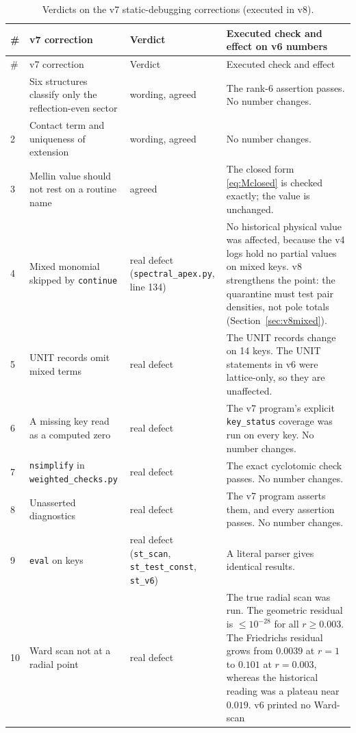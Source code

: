 \documentclass[11pt,a4paper]{article}
\newcommand{\loc}[1]{\nolinkurl{#1}}
\theoremstyle{plain}
\theoremstyle{definition}
\theoremstyle{remark}
\numberwithin{equation}{section}
\begin{document}
\begingroup\small
\begin{longtable}{@{}p{.04\linewidth}L{.30\linewidth}L{.16\linewidth}L{.42\linewidth}@{}}
\caption{Verdicts on the v7 static-debugging corrections
(executed in v8).}
\label{tab:v8verdict}\\
\toprule
\# & v7 correction & Verdict & Executed check and effect on v6 numbers\\
\midrule
\endfirsthead
\toprule
\# & v7 correction & Verdict & Executed check and effect\\
\midrule
\endhead
\bottomrule
{} & Six structures classify only the reflection-even sector &
wording, agreed & The rank-6 assertion passes. No number changes.\\
2 & Contact term and uniqueness of extension & wording, agreed &
No number changes.\\
3 & Mellin value should not rest on a routine name & agreed &
The closed form \eqref{eq:Mclosed} is checked exactly; the value is
unchanged.\\
4 & Mixed monomial skipped by \loc{continue} & real defect
(\loc{spectral_apex.py}, line 134) & No historical physical value
was affected, because the v4 logs hold no partial values on mixed
keys. v8 strengthens the point: the quarantine must test pair
densities, not pole totals (Section~\ref{sec:v8mixed}).\\
5 & UNIT records omit mixed terms & real defect & The UNIT records
change on 14 keys. The UNIT statements in v6 were lattice-only, so
they are unaffected.\\
6 & A missing key read as a computed zero & real defect &
The v7 program's explicit \loc{key_status} coverage was run on
every key. No number changes.\\
7 & \loc{nsimplify} in \loc{weighted_checks.py} & real defect &
The exact cyclotomic check passes. No number changes.\\
8 & Unasserted diagnostics & real defect & The v7 program asserts
them, and every assertion passes. No number changes.\\
9 & \loc{eval} on keys & real defect (\loc{st_scan},
\loc{st_test_const}, \loc{st_v6}) & A literal parser gives
identical results.\\
10 & Ward scan not at a radial point & real defect & The true
radial scan was run. The geometric residual is \(\le10^{-28}\) for
all \(r\ge0.003\). The Friedrichs residual grows from \(0.0039\)
at \(r=1\) to \(0.101\) at \(r=0.003\), whereas the historical
reading was a plateau near \(0.019\). v6 printed no Ward-scan

\end{longtable}
\end{document}
